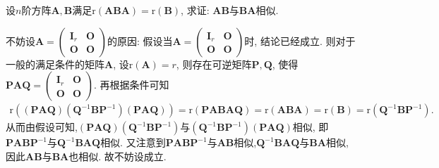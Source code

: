 \documentclass[../../main.tex]{subfiles}
\begin{document}
\begin{example}
设\(n\)阶方阵\(\boldsymbol{A},\boldsymbol{B}\)满足\(\mathrm{r}(\boldsymbol{ABA})=\mathrm{r}(\boldsymbol{B})\), 求证: \(\boldsymbol{AB}\)与\(\boldsymbol{BA}\)相似.
\end{example}
\begin{remark}
不妨设\(\boldsymbol{A}=\begin{pmatrix}\boldsymbol{I}_{r}&\boldsymbol{O}\\\boldsymbol{O}&\boldsymbol{O}\end{pmatrix}\)的原因: 假设当\(\boldsymbol{A}=\begin{pmatrix}\boldsymbol{I}_{r}&\boldsymbol{O}\\\boldsymbol{O}&\boldsymbol{O}\end{pmatrix}\)时, 结论已经成立. 则对于一般的满足条件的矩阵\(\boldsymbol{A}\), 设\(\mathrm{r}(\boldsymbol{A}) = r\), 则存在可逆矩阵\(\boldsymbol{P},\boldsymbol{Q}\), 使得\(\boldsymbol{PAQ}=\begin{pmatrix}\boldsymbol{I}_{r}&\boldsymbol{O}\\\boldsymbol{O}&\boldsymbol{O}\end{pmatrix}\). 再根据条件可知
\begin{align*}
\mathrm{r}((\boldsymbol{PAQ})(\boldsymbol{Q}^{-1}\boldsymbol{BP}^{-1})(\boldsymbol{PAQ}))=\mathrm{r}(\boldsymbol{PABAQ})=\mathrm{r}(\boldsymbol{ABA})=\mathrm{r}(\boldsymbol{B})=\mathrm{r}(\boldsymbol{Q}^{-1}\boldsymbol{BP}^{-1}).
\end{align*}
从而由假设可知,\((\boldsymbol{PAQ})(\boldsymbol{Q}^{-1}\boldsymbol{BP}^{-1})\)与\((\boldsymbol{Q}^{-1}\boldsymbol{BP}^{-1})(\boldsymbol{PAQ})\)相似, 即\(\boldsymbol{PABP}^{-1}\)与\(\boldsymbol{Q}^{-1}\boldsymbol{BAQ}\)相似. 又注意到\(\boldsymbol{PABP}^{-1}\)与\(\boldsymbol{AB}\)相似,\(\boldsymbol{Q}^{-1}\boldsymbol{BAQ}\)与\(\boldsymbol{BA}\)相似, 因此\(\boldsymbol{AB}\)与\(\boldsymbol{BA}\)也相似. 故不妨设成立.
\end{remark}
\end{document}
